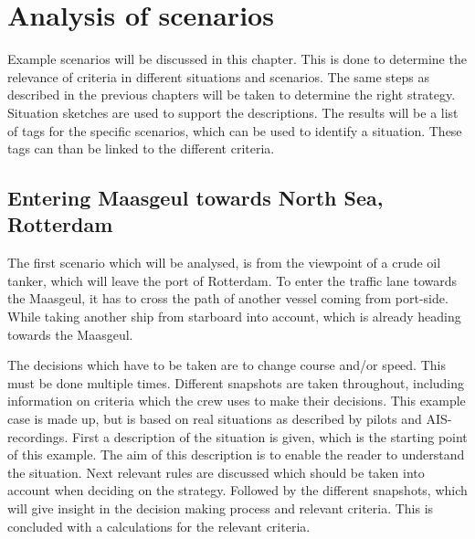 \chapter{Analysis of scenarios}
\label{ch:scenario-examples}
Example scenarios will be discussed in this chapter. This is done to determine the relevance of criteria in different situations and scenarios. The same steps as described in the previous chapters will be taken to determine the right strategy. Situation sketches are used to support the descriptions. The results will be a list of tags for the specific scenarios, which can be used to identify a situation. These tags can than be linked to the different criteria.

\section{Entering Maasgeul towards North Sea, Rotterdam}
The first scenario which will be analysed, is from the viewpoint of a crude oil tanker, which will leave the port of Rotterdam. To enter the traffic lane towards the Maasgeul, it has to cross the path of another vessel coming from port-side. While taking another ship from starboard into account, which is already heading towards the Maasgeul.

The decisions which have to be taken are to change course and/or speed. This must be done multiple times. Different snapshots are taken throughout, including information on criteria which the crew uses to make their decisions.
This example case is made up, but is based on real situations as described by pilots and \ac{AIS}-recordings.
First a description of the situation is given, which is the starting point of this example. The aim of this description is to enable the reader to understand the situation.
Next relevant rules are discussed which should be taken into account when deciding on the strategy.
Followed by the different snapshots, which will give insight in the decision making process and relevant criteria. This is concluded with a calculations for the relevant criteria.

